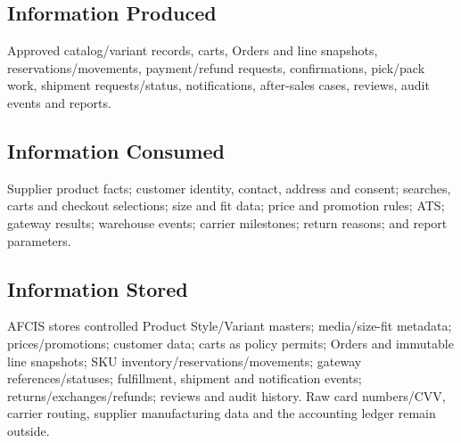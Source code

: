 \documentclass[10pt,a4paper]{article}
\begin{document}
\subsection{Information Produced}
Approved catalog/variant records, carts, Orders and line snapshots, reservations/movements, payment/refund requests, confirmations, pick/pack work, shipment requests/status, notifications, after-sales cases, reviews, audit events and reports.

\subsection{Information Consumed}
Supplier product facts; customer identity, contact, address and consent; searches, carts and checkout selections; size and fit data; price and promotion rules; ATS; gateway results; warehouse events; carrier milestones; return reasons; and report parameters.

\subsection{Information Stored}
AFCIS stores controlled Product Style/Variant masters; media/size-fit metadata; prices/promotions; customer data; carts as policy permits; Orders and immutable line snapshots; SKU inventory/reservations/movements; gateway references/statuses; fulfillment, shipment and notification events; returns/exchanges/refunds; reviews and audit history. Raw card numbers/CVV, carrier routing, supplier manufacturing data and the accounting ledger remain outside.
\end{document}
